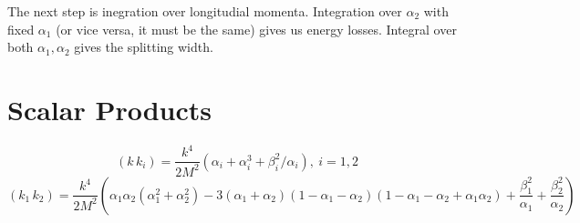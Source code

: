 \documentclass[12pt]{article}
\begin{document}
The next step is inegration over longitudial momenta. Integration over $\alpha_2$ with fixed $\alpha_1$ (or vice versa, it must be the same) gives us energy losses. Integral over both $\alpha_1,\alpha_2$ gives the splitting width.

\section{Scalar Products}
\begin{equation}
    (k\, k_i)= \frac{k^4}{2M^2}\left( \alpha_i + \alpha_i^3 + \beta^2_i/\alpha_i \right), \ i=1,2
\end{equation}
\begin{equation}
    (k_1\, k_2)= \frac{k^4}{2M^2}\left( \alpha_1\alpha_2(\alpha_1^2+\alpha_2^2) - 3(\alpha_1+\alpha_2)(1-\alpha_1-\alpha_2)(1-\alpha_1-\alpha_2 + \alpha_1\alpha_2) +\frac{\beta_1^2}{\alpha_1} + \frac{\beta_2^2}{\alpha_2} \right)
\end{equation}
\end{document}
